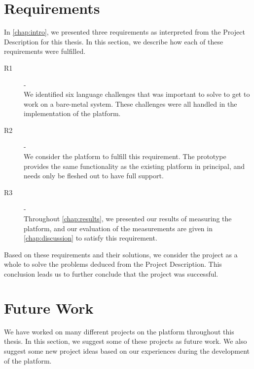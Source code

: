 \section{Requirements}

In \autoref{chap:intro}, we presented three requirements as interpreted from the Project Description for this thesis.
In this section, we describe how each of these requirements were fulfilled.

\begin{description}
    \item[R1] - {{\reqi}} \hfill \\
    We identified six language challenges that was important to solve to get {\rust} to work on a bare-metal system.
    These challenges were all handled in the implementation of the {\rg} platform.

  \item[R2] - {{\reqii}} \hfill \\
    We consider the {\rg} platform to fulfill this requirement.
    The prototype provides the same functionality as the existing {\C} platform in principal, and needs only be fleshed out to have full support.

    \item[R3] - {{\reqiii}} \hfill \\
    Throughout \autoref{chap:results}, we presented our results of measuring the {\rg} platform, and our evaluation of the measurements are given in \autoref{chap:discussion} to satisfy this requirement.
\end{description}

Based on these requirements and their solutions, we consider the project as a whole to solve the problems deduced from the Project Description.
This conclusion leads us to further conclude that the project was successful.

\section{Future Work}
\label{chap:future}

We have worked on many different projects on the {\rg} platform throughout this thesis.
In this section, we suggest some of these projects as future work.
We also suggest some new project ideas based on our experiences during the development of the {\rg} platform.


